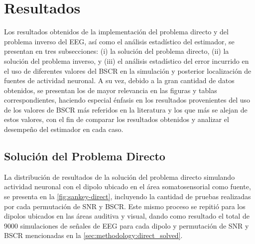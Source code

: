 %
\chapter{Resultados}
\label{sec:results}

Los resultados obtenidos de la implementación del problema directo y del problema inverso del EEG, así como el análisis estadístico del estimador, se presentan en tres subsecciones: (i) la solución del problema directo, (ii) la solución del problema inverso, y (iii) el análisis estadístico del error incurrido en el uso de diferentes valores del BSCR en la simulación y posterior localización de fuentes de actividad neuronal.
A su vez, debido a la gran cantidad de datos obtenidos, se presentan los de mayor relevancia en las figuras y tablas correspondientes, haciendo especial énfasis en los resultados provenientes del uso de los valores de BSCR más referidos en la literatura y los que más se alejan de estos valores, con el fin de comparar los resultados obtenidos y analizar el desempeño del estimador en cada caso.

\section{Solución del Problema Directo}
\label{sec:results:direct}


La distribución de resultados de la solución del problema directo simulando actividad neuronal con el dipolo ubicado en el área somatosensorial como fuente, se presenta en la \cref{fig:sankey-direct}, incluyendo la cantidad de pruebas realizadas por cada permutación de SNR y BSCR. 
Este mismo proceso se repitió para los dipolos ubicados en las áreas auditiva y visual, dando como resultado el total de 9000 simulaciones de señales de EEG para cada dipolo y permutación de SNR y BSCR mencionadas en la \cref{sec:methodology:direct_solved}.

